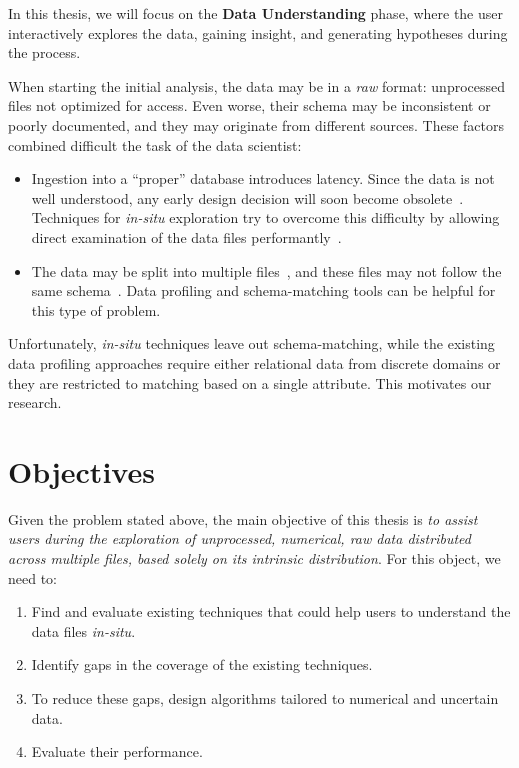 In this thesis, we will focus on the \textbf{Data Understanding} phase, where the user interactively
explores the data, gaining insight, and generating hypotheses during the process.

When starting the initial analysis, the data may be in a \emph{raw} format: unprocessed files not optimized for access. Even worse, their schema may be inconsistent or poorly documented, and they may originate from different sources. These factors combined difficult the task of the data scientist:

\begin{itemize}
    \item Ingestion into a ``proper'' database introduces latency. Since the data is not well
        understood, any early design decision will soon become obsolete~\cite{Kersten2011}.
        Techniques for \emph{in-situ} exploration try to overcome this difficulty
        by allowing direct examination of the data files performantly~\cite{Idreos2011}.
    \item The data may be split into multiple files~\cite{Baud2012}, and these files may not
        follow the same schema~\cite{Alawini2014}. Data profiling and schema-matching tools
        can be helpful for this type of problem.
\end{itemize}

Unfortunately, \emph{in-situ} techniques leave out schema-matching, while the existing
data profiling approaches require either relational data from discrete domains or they are restricted to matching based on a single attribute. This motivates our
research.

\section{Objectives}
\label{sec:main_objective}

Given the problem stated above, the main objective of this
thesis is \emph{to assist users during the exploration of unprocessed,
numerical, raw data distributed across multiple files,
based solely on its intrinsic distribution}. For this
object, we need to:

\begin{enumerate}
    \item Find and evaluate existing techniques that could help users to
    understand the data files \emph{in-situ}.
    \item Identify gaps in the coverage of the existing techniques.
    \item To reduce these gaps, design algorithms tailored to numerical and uncertain data.
    \item Evaluate their performance.
\end{enumerate}
\label{enum:objectives}

